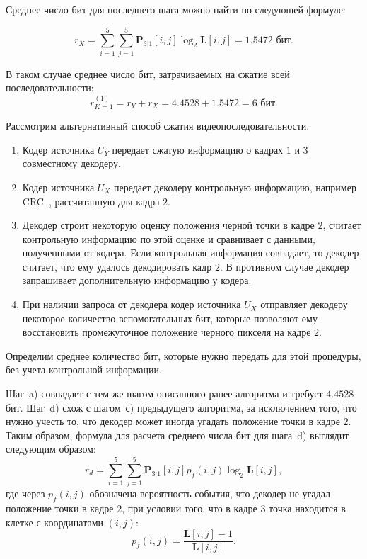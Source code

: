 \begin{enumerate}
Среднее число бит для последнего шага можно найти по следующей формуле:

\begin{equation*}
r_X = \sum\limits_{i=1}^{5}\sum\limits_{j=1}^{5} \mathbf{P}_{3 \vert 1}[i,j]\log_2 \mathbf{L}[i,j] = 1.5472\text{ бит}.
\end{equation*}

В таком случае среднее число бит, затрачиваемых на сжатие всей последовательности:
\begin{equation*}
r_{K=1}^{(1)} = r_Y + r_X = 4.4528 + 1.5472 = 6\text{ бит.}
\end{equation*}

Рассмотрим альтернативный способ сжатия видеопоследовательности.

\begin{enumerate}
\item\label{it:ex2:2:a} Кодер источника $U_Y$ передает сжатую информацию о кадрах $1$ и $3$ совместному декодеру.
\item\label{it:ex2:2:b} Кодер источника $U_X$ передает декодеру контрольную информацию, например CRC~\cite{Koopman04cyclicredundancy}, рассчитанную для кадра $2$.
\item\label{it:ex2:2:c} Декодер строит некоторую оценку положения черной точки в кадре $2$, считает контрольную информацию по этой оценке и сравнивает с данными, полученными от кодера. Если контрольная информация совпадает, то декодер считает, что ему удалось декодировать кадр $2$. В противном случае декодер запрашивает дополнительную информацию у кодера.
\item\label{it:ex2:2:d} При наличии запроса от декодера кодер источника $U_X$ отправляет декодеру некоторое количество вспомогательных бит, которые позволяют ему восстановить промежуточное положение черного пикселя на кадре $2$.
\end{enumerate}

Определим среднее количество бит, которые нужно передать для этой процедуры, без учета контрольной информации.

Шаг~a) совпадает с тем же шагом описанного ранее алгоритма и требует $4.4528$ бит. Шаг~d) схож с шагом~с) предыдущего алгоритма, за исключением того, что нужно учесть то, что декодер может иногда угадать положение точки в кадре $2$. Таким образом, формула для расчета среднего числа бит для шага~d) выглядит следующим образом:
\begin{equation*}
r_d = \sum\limits_{i=1}^{5}\sum\limits_{j=1}^{5} \mathbf{P}_{3 \vert 1}[i,j]p_f(i,j)\log_2 \mathbf{L}[i,j],
\end{equation*}
где через $p_f(i,j)$ обозначена вероятность события, что декодер не угадал положение точки в кадре $2$, при условии того, что в кадре $3$ точка находится в клетке с координатами $(i,j)$:
\begin{equation*}
p_f(i,j) = \frac{\mathbf{L}[i,j]-1}{\mathbf{L}[i,j]}.
\end{equation*}


\end{enumerate}
